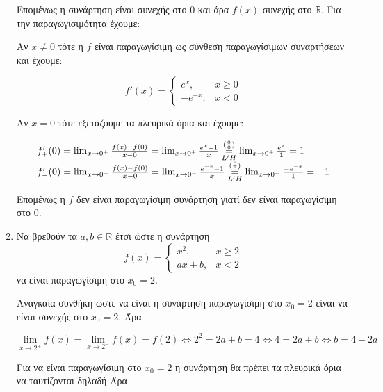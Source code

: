 \begin{enumerate}
		Επομένως η συνάρτηση είναι συνεχής στο 0 και άρα $ f(x) $ συνεχής στο $
		\mathbb{R} $.
		Για την παραγωγισιμότητα έχουμε:

		Αν $ x \neq 0 $ τότε η $f$ είναι παραγωγίσιμη ως σύνθεση παραγωγίσιμων
		συναρτήσεων και έχουμε:

		\[
			f'(x) = \begin{cases}
				e^{x}, & x\geq 0 \\
				-e^{-x}, & x < 0
			\end{cases}
		\]

		Αν $ x = 0 $ τότε εξετάζουμε τα πλευρικά όρια και έχουμε:

		\[
			\begin{tabular}{l}
			$f_{+}'(0) = \lim_{x\to 0^{+}} \frac{f(x) - f(0)}{x - 0} = \lim_{x \to
				0^{+}} \frac{e^{x} - 1}{x}
				\overset{(\frac{0}{0})}{\underset{L'H}{=}} \lim_{x\to 0^{+}}
			\frac{e^{x}}{1} = 1 $ \\
			$f_{-}'(0) = \lim_{x\to 0^{-}} \frac{f(x) - f(0)}{x - 0} =
			\lim_{x\to 0^{-}} \frac{e^{-x} - 1}{x} \overset{(\frac{0}{0})}{\underset{L'H}{=}}
			\lim_{x\to 0^{-}}
			\frac{-e^{-x}}{1} = -1 $
			\end{tabular}
		\]
		
		Επομένως η $f$ δεν είναι παραγωγίσιμη συνάρτηση γιατί δεν είναι
		παραγωγίσιμη στο 0.



	\item Να βρεθούν τα $ a, b \in \mathbb{R} $ έτσι ώστε η συνάρτηση 
		\[
			f(x) = \begin{cases}
				x^{2}, & x\geq 2 \\
				ax+b , & x<2
			\end{cases}
		\]
		να είναι παραγωγίσιμη στο $ x_{0} = 2 $.


		
		Αναγκαία συνθήκη ώστε να είναι η συνάρτηση παραγωγίσιμη στο $ x_{0} = 2
		$ είναι να είναι συνεχής στο $ x_{0} = 2 $. Άρα

		\begin{equation}\label{eq:cont}
			\lim_{x\to 2^{+}} f(x) = \lim_{x\to 2^{-}} f(x) = f(2)
			\Leftrightarrow 2^{2} = 2a + b = 4 \Leftrightarrow 4 = 2a + b
			\Leftrightarrow b = 4 - 2a
		\end{equation}
		
		Για να είναι παραγωγίσιμη στο $ x_{0} = 2 $ η συνάρτηση θα πρέπει τα
		πλευρικά όρια να ταυτίζονται δηλαδή  Άρα


\end{enumerate}
